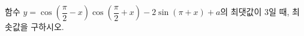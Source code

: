 함수 $y=\cos\left(\dfrac{\pi}{2}-x\right)\cos\left(\dfrac{\pi}{2}+x\right)-2\sin(\pi+x)+a$의 최댓값이 $3$일 때, 최솟값을 구하시오. 
